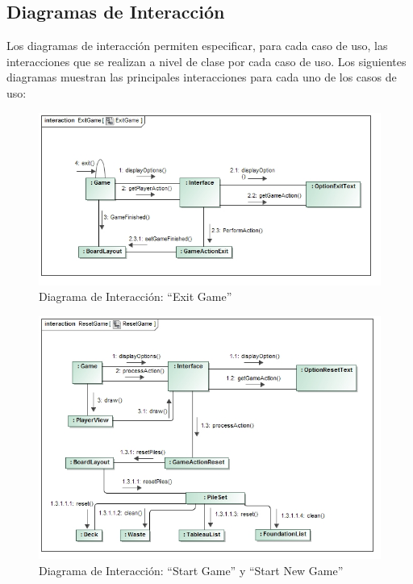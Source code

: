 \documentclass[11pt]{article}
\begin{document}
\subsection{Diagramas de Interacción} 

Los diagramas de interacción permiten especificar, para cada caso de uso, las interacciones que se realizan a nivel de clase por cada caso de uso. Los siguientes diagramas muestran las principales interacciones para cada uno de los casos de uso:

\begin{center}
 \begin{figure}[H]
 \begin{center}
   \includegraphics[width=16cm]{Analysis/ExitGameSequence00.jpg}
   \caption{Diagrama de Interacción: ``Exit Game''}
   \label{fig:exitgamesequence}
 \end{center}
 \end{figure}
\end{center}

\begin{center}
 \begin{figure}[H]
 \begin{center}
   \includegraphics[width=16cm]{Analysis/ResetGameSequence00.jpg}
   \caption{Diagrama de Interacción: ``Start Game'' y ``Start New Game''}
   \label{fig:exitgamesequence}
 \end{center}
 \end{figure}
\end{center}
\end{document}
